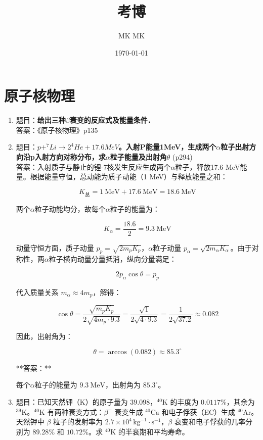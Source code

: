 \documentclass{article}
\title{考博}
\author{MK MK}
\date{\today}
\begin{document}
\maketitle

\section{原子核物理}


\begin{enumerate}
    \item 题目：\textbf{给出三种$\beta$衰变的反应式及能量条件．}\\答案：《原子核物理》p135
\item 题目：\textbf{$p + ^{7}Li \rightarrow 2^{4}He + 17.6 MeV$。入射P能量1MeV，生成两个$\alpha$粒子出射方向沿p入射方向对称分布，求$\alpha$粒子能量及出射角$\theta$} 
   (p294)\\   
 答案：入射质子与静止的锂-7核发生反应生成两个$\alpha$粒子，释放17.6 MeV能量。根据能量守恒，总动能为质子动能（1 MeV）与释放能量之和：

\[
K_{\text{总}} = 1\ \text{MeV} + 17.6\ \text{MeV} = 18.6\ \text{MeV}
\]

两个$\alpha$粒子动能均分，故每个$\alpha$粒子的能量为：

\[
K_{\alpha} = \frac{18.6}{2} = 9.3\ \text{MeV}
\]

动量守恒方面，质子动量 \(p_p = \sqrt{2m_p K_p}\)，$\alpha$粒子动量 \(p_{\alpha} = \sqrt{2m_{\alpha} K_{\alpha}}\)。由于对称性，两$\alpha$粒子横向动量分量抵消，纵向分量满足：

\[
2p_{\alpha} \cos\theta = p_p
\]

代入质量关系 \(m_{\alpha} \approx 4m_p\)，解得：

\[
\cos\theta = \frac{\sqrt{m_p K_p}}{2\sqrt{4m_p \cdot 9.3}} = \frac{\sqrt{1}}{2\sqrt{4 \cdot 9.3}} = \frac{1}{2\sqrt{37.2}} \approx 0.082
\]

因此，出射角为：

\[
\theta = \arccos(0.082) \approx 85.3^\circ
\]

**答案：**

每个$\alpha$粒子的能量为 \(\boxed{9.3\ \text{MeV}}\)，出射角为 \(\boxed{85.3^\circ}\)。
\item 
题目：已知天然钾（K）的原子量为 \(39.098\)，\(^{40}\text{K}\) 的丰度为 \(0.0117\%\)，其余为 \(^{39}\text{K}\)。\(^{40}\text{K}\) 有两种衰变方式：\(\beta^-\) 衰变生成 \(^{40}\text{Ca}\) 和电子俘获（EC）生成 \(^{40}\text{Ar}\)。天然钾中 \(\beta\) 粒子的发射率为 \(2.7 \times 10^4 \, \text{kg}^{-1} \cdot \text{s}^{-1}\)，\(\beta\) 衰变和电子俘获的几率分别为 \(89.28\%\) 和 \(10.72\%\)。求 \(^{40}\text{K}\) 的半衰期和平均寿命。



\end{enumerate}
\end{document}
